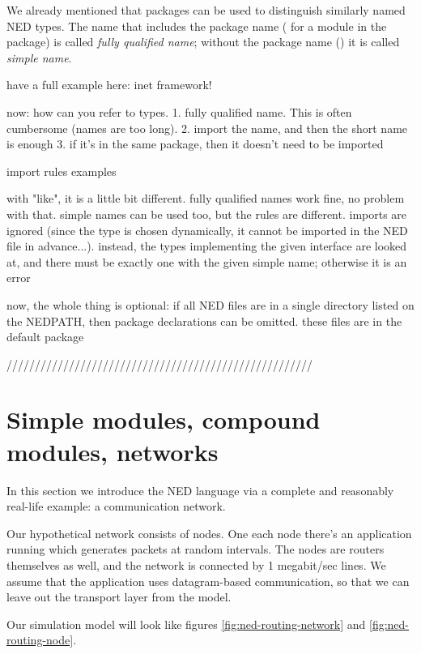 We already mentioned that packages can be used to distinguish
similarly named NED types. The name that includes the package name
( for a  module in the 
package) is called \textit{fully qualified name}; without the package
name () it is called \textit{simple name}.


have a full example here: inet framework!

now: how can you refer to types.
1. fully qualified name. This is often cumbersome (names are too long).
2. import the name, and then the short name is enough
3. if it's in the same package, then it doesn't need to be imported

import rules
examples

with "like", it is a little bit different. fully qualified names work fine,
no problem with that. simple names can be used too, but the rules are
different. imports are ignored (since the type is chosen dynamically,
it cannot be imported in the NED file in advance...).
instead, the types implementing the given interface are looked at, and
there must be exactly one with the given simple name; otherwise it is an error

now, the whole thing is optional: if all NED files are in a single directory
listed on the NEDPATH, then package declarations can be omitted. these files
are in the default package


\bigskip
\bigskip
//////////////////////////////////////////////////////
\bigskip
\bigskip

\section{Simple modules, compound modules, networks}

In this section we introduce the NED language via a complete and
reasonably real-life example: a communication network.

Our hypothetical network consists of nodes. One each node there's an
application running which generates packets at random intervals.
The nodes are routers themselves as well, and the network is connected
by 1 megabit/sec lines. We assume that the application uses datagram-based
communication, so that we can leave out the transport layer from the model.

Our simulation model will look like figures \ref{fig:ned-routing-network}
and \ref{fig:ned-routing-node}.

